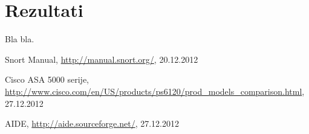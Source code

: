 \documentclass[12pt]{article}
\let\stdsection\section
\renewcommand\section{\newpage\stdsection}
\begin{document}
\section{Rezultati}

Bla bla.

\clearpage
{}
\begin{thebibliography}{9}


Snort Manual, \url{http://manual.snort.org/}, 20.12.2012

Cisco ASA 5000 serije, \url{http://www.cisco.com/en/US/products/ps6120/prod_models_comparison.html}, 27.12.2012

AIDE, \url{http://aide.sourceforge.net/}, 27.12.2012

\end{thebibliography}
\end{document}
